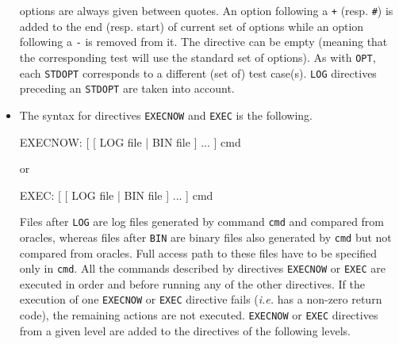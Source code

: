 \begin{itemize}
options are always given between quotes. An option following a \texttt{+}
(resp. \texttt{\#}) is added to the end (resp. start) of current set of options
while an option following a \texttt{-} is removed from it. The directive can be
empty (meaning that the corresponding test will use the standard set of
options). As with \texttt{OPT}, each \texttt{STDOPT} corresponds to a different
(set of) test case(s). \texttt{LOG} directives preceding an \texttt{STDOPT}
are taken into account.
\item The syntax for directives
  \texttt{EXECNOW}
  and \texttt{EXEC} is the following.
  \begin{code}
    EXECNOW: [ [ LOG file | BIN file ] ... ] cmd
  \end{code}
or
  \begin{code}
    EXEC: [ [ LOG file | BIN file ] ... ] cmd
  \end{code}
  Files after \texttt{LOG} are log files generated by command \texttt{cmd} and
  compared from oracles, whereas files after \texttt{BIN} are binary files also
  generated by \texttt{cmd} but not compared from oracles. Full access path to
  these files have to be specified only in \texttt{cmd}. All the commands
  described by directives \texttt{EXECNOW} or \texttt{EXEC} are executed in
  order and
  before running any of the other directives. If the execution of
  one \texttt{EXECNOW} or \texttt{EXEC} directive fails ({\it i.e.} has a
  non-zero return
  code), the remaining actions are not executed.
  \texttt{EXECNOW} or \texttt{EXEC}
  directives from a given level are added to the directives of the following
  levels.


\end{itemize}

